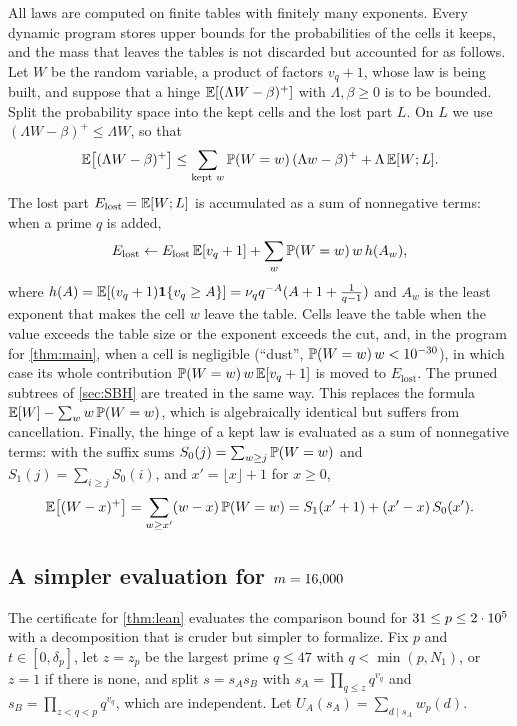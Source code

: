 All laws are computed on finite tables with finitely many exponents. Every dynamic program stores upper bounds for the
probabilities of the cells it keeps, and the mass that leaves the tables is not discarded but accounted for as
follows. Let $W$ be the random variable, a product of factors $v_q+1$, whose law is being built, and suppose that a
hinge $\E[(\Lambda W-\beta)^+]$ with $\Lambda,\beta\ge0$ is to be bounded. Split the probability space into the kept
cells and the lost part $L$. On $L$ we use $(\Lambda W-\beta)^+\le\Lambda W$, so that
\[
  \E\bigl[(\Lambda W-\beta)^+\bigr]\le\sum_{\text{kept }w}\P(W=w)\,(\Lambda w-\beta)^++\Lambda\,\E[W;L].
\]
The lost part $E_{\mathrm{lost}}=\E[W;L]$ is accumulated as a sum of nonnegative terms: when a prime $q$ is added,
\begin{equation}\label{eq:lost}
  E_{\mathrm{lost}}\leftarrow E_{\mathrm{lost}}\,\E[v_q+1]+\sum_{w}\P(W=w)\,w\,h(A_w),
\end{equation}
where $h(A)=\E[(v_q+1)\one\{v_q\ge A\}]=\nu_qq^{-A}(A+1+\frac1{q-1})$ and $A_w$ is the least exponent that makes
the cell $w$ leave the table. Cells leave the table when the value
exceeds the table size or the exponent exceeds the cut, and, in the program for \cref{thm:main}, when a cell is
negligible (``dust'', $\P(W=w)\,w<10^{-30}$), in which case its whole contribution $\P(W=w)\,w\,\E[v_q+1]$ is moved to
$E_{\mathrm{lost}}$. The pruned subtrees of \cref{sec:SBH} are treated in the same way. This replaces the formula
$\E[W]-\sum_ww\,\P(W=w)$, which is algebraically identical but suffers from cancellation. Finally, the hinge of a
kept law is evaluated as a sum of nonnegative terms: with the suffix sums $S_0(j)=\sum_{w\ge j}\P(W=w)$ and
$S_1(j)=\sum_{i\ge j}S_0(i)$, and $x'=\lfloor x\rfloor+1$ for $x\ge0$,
\begin{equation}\label{eq:suffix}
  \E\bigl[(W-x)^+\bigr]=\sum_{w\ge x'}(w-x)\,\P(W=w)=S_1(x'+1)+(x'-x)\,S_0(x').
\end{equation}

\subsection{A simpler evaluation for $m=\MzeroLean$}\label{sec:AB}

The certificate for \cref{thm:lean} evaluates the comparison bound for $31\le p\le\PX$ with a decomposition that is
cruder but simpler to formalize. Fix $p$ and $t\in[0,\delta_p]$, let $z=z_p$ be the largest prime $q\le47$ with
$q<\min(p,N_1)$, or $z=1$ if there is none, and split $s=s_As_B$ with $s_A=\prod_{q\le z}q^{v_q}$ and
$s_B=\prod_{z<q<p}q^{v_q}$, which are independent. Let $U_A(s_A)=\sum_{d\mid s_A}w_p(d)$.

